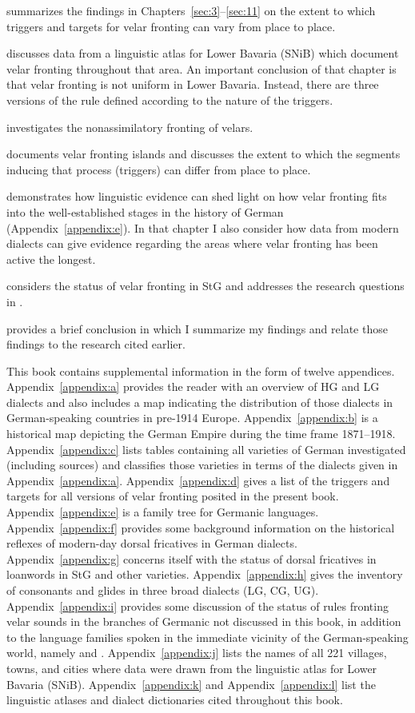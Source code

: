  summarizes the findings in Chapters~\ref{sec:3}--\ref{sec:11} on the extent to which triggers and targets for velar fronting can vary from place to place.

 discusses data from a linguistic atlas for Lower Bavaria (SNiB) which document velar fronting throughout that area. An important conclusion of that chapter is that velar fronting is not uniform in Lower Bavaria. Instead, there are three versions of the rule defined according to the nature of the triggers.

 investigates the nonassimilatory fronting of velars.

 documents velar fronting islands and discusses the extent to which the segments inducing that process (triggers) can differ from place to place.

 demonstrates how linguistic evidence can shed light on how velar fronting fits into the well-established stages in the history of German (Appendix~\ref{appendix:e}). In that chapter I also consider how data from modern dialects can give evidence regarding the areas where velar fronting has been active the longest. 

 considers the status of velar fronting in StG and addresses the research questions in .

 provides a brief conclusion in which I summarize my findings and relate those findings to the research cited earlier.

This book contains supplemental information in the form of twelve appendices. Appendix~\ref{appendix:a} provides the reader with an overview of HG and LG dialects and also includes a map indicating the distribution of those dialects in German-speaking countries in pre-1914 Europe. Appendix~\ref{appendix:b} is a historical map depicting the German Empire during the time frame 1871--1918. Appendix~\ref{appendix:c} lists tables containing all varieties of German investigated (including sources) and classifies those varieties in terms of the dialects given in Appendix~\ref{appendix:a}. Appendix~\ref{appendix:d} gives a list of the triggers and targets for all versions of velar fronting posited in the present book. Appendix~\ref{appendix:e} is a family tree for Germanic languages. Appendix~\ref{appendix:f} provides some background information on the historical reflexes of modern-day dorsal fricatives in German dialects. Appendix~\ref{appendix:g} concerns itself with the status of dorsal fricatives in loanwords in StG and other varieties. Appendix~\ref{appendix:h} gives the inventory of consonants and glides in three broad dialects (LG, CG, UG). Appendix~\ref{appendix:i} provides some discussion of the status of rules fronting velar sounds in the branches of Germanic not discussed in this book, in addition to the language families spoken in the immediate vicinity of the German-speaking world, namely  and . Appendix~\ref{appendix:j} lists the names of all 221 villages, towns, and cities where data were drawn from the linguistic atlas for Lower Bavaria (SNiB). Appendix~\ref{appendix:k} and Appendix~\ref{appendix:l} list the linguistic atlases and dialect dictionaries cited throughout this book. 
